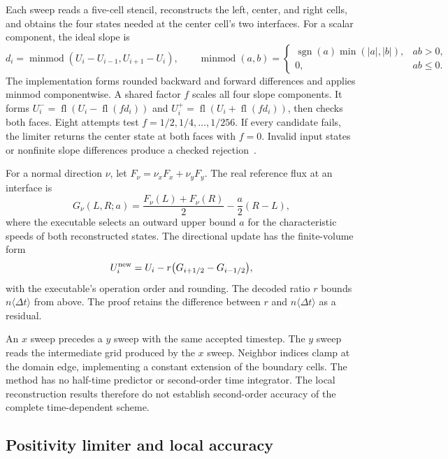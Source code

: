 \documentclass[11pt]{article}
\newcommand{\val}[1]{\langle #1\rangle}
\newcommand{\fl}{\operatorname{fl}}
\newcommand{\mm}{\operatorname{minmod}}
\begin{document}
Each sweep reads a five-cell stencil, reconstructs the left, center, and right cells, and obtains the four states needed at the center cell's two interfaces.  For a scalar component, the ideal slope is
\begin{equation}
d_i=\mm(U_i-U_{i-1},U_{i+1}-U_i),\qquad
\mm(a,b)=\begin{cases}\operatorname{sgn}(a)\min(|a|,|b|),&ab>0,\\0,&ab\leq0.\end{cases}
\end{equation}
The implementation forms rounded backward and forward differences and applies minmod componentwise.  A shared factor $f$ scales all four slope components.  It forms $U_i^-=\fl(U_i-\fl(f d_i))$ and $U_i^+=\fl(U_i+\fl(f d_i))$, then checks both faces.  Eight attempts test $f=1/2,1/4,\ldots,1/256$.  If every candidate fails, the limiter returns the center state at both faces with $f=0$.  Invalid input states or nonfinite slope differences produce a checked rejection~\cite{reconstruction}.

For a normal direction $\nu$, let $F_\nu=\nu_xF_x+\nu_yF_y$.  The real reference flux at an interface is
\begin{equation}
G_\nu(L,R;a)=\frac{F_\nu(L)+F_\nu(R)}{2}-\frac a2(R-L),\label{eq:rusanov}
\end{equation}
where the executable selects an outward upper bound $a$ for the characteristic speeds of both reconstructed states.  The directional update has the finite-volume form
\begin{equation}
U_i^{\rm new}=U_i-r\bigl(G_{i+1/2}-G_{i-1/2}\bigr),\label{eq:update}
\end{equation}
with the executable's operation order and rounding.  The decoded ratio $r$ bounds $n\val{\Delta t}$ from above.  The proof retains the difference between $r$ and $n\val{\Delta t}$ as a residual.

An $x$ sweep precedes a $y$ sweep with the same accepted timestep.  The $y$ sweep reads the intermediate grid produced by the $x$ sweep.  Neighbor indices clamp at the domain edge, implementing a constant extension of the boundary cells.  The method has no half-time predictor or second-order time integrator.  The local reconstruction results therefore do not establish second-order accuracy of the complete time-dependent scheme.

\subsection{Positivity limiter and local accuracy}
\end{document}
